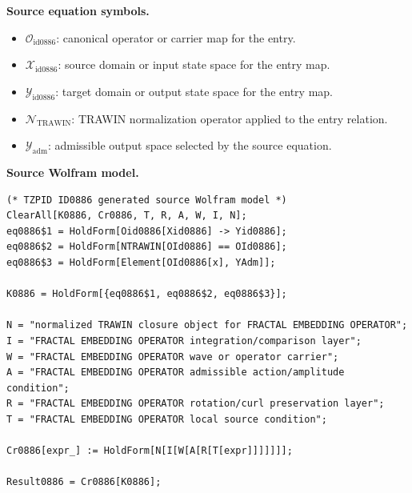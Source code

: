 \begin{minipage}[t]{0.49\linewidth}
\begingroup
\small
\raggedright
\textbf{Source equation symbols.}\par
\begin{itemize}[leftmargin=1.35em,itemsep=1pt,topsep=1pt,parsep=0pt]
    \item $\mathcal{O}_{\mathrm{id0886}}$: canonical operator or carrier map for the entry.
    \item $\mathcal{X}_{\mathrm{id0886}}$: source domain or input state space for the entry map.
    \item $\mathcal{Y}_{\mathrm{id0886}}$: target domain or output state space for the entry map.
    \item $\mathcal{N}_{\mathrm{TRAWIN}}$: TRAWIN normalization operator applied to the entry relation.
    \item $\mathcal{Y}_{\mathrm{adm}}$: admissible output space selected by the source equation.
\end{itemize}
\endgroup
\end{minipage}\hfill
\begin{minipage}[t]{0.47\linewidth}
\begingroup
\scriptsize
\raggedright
\textbf{Source Wolfram model.}\par
\begin{Verbatim}[fontsize=\tiny,breaklines=true,breakanywhere=true]
(* TZPID ID0886 generated source Wolfram model *)
ClearAll[K0886, Cr0886, T, R, A, W, I, N];
eq0886$1 = HoldForm[Oid0886[Xid0886] -> Yid0886];
eq0886$2 = HoldForm[NTRAWIN[OId0886] == OId0886];
eq0886$3 = HoldForm[Element[OId0886[x], YAdm]];

K0886 = HoldForm[{eq0886$1, eq0886$2, eq0886$3}];

N = "normalized TRAWIN closure object for FRACTAL EMBEDDING OPERATOR";
I = "FRACTAL EMBEDDING OPERATOR integration/comparison layer";
W = "FRACTAL EMBEDDING OPERATOR wave or operator carrier";
A = "FRACTAL EMBEDDING OPERATOR admissible action/amplitude condition";
R = "FRACTAL EMBEDDING OPERATOR rotation/curl preservation layer";
T = "FRACTAL EMBEDDING OPERATOR local source condition";

Cr0886[expr_] := HoldForm[N[I[W[A[R[T[expr]]]]]]];

Result0886 = Cr0886[K0886];
\end{Verbatim}
\endgroup
\end{minipage}

